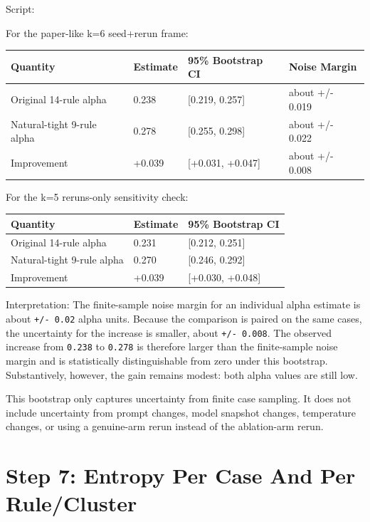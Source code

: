 \documentclass[11pt]{article}
\begin{document}
Script:

\href{../scripts/bootstrap_alpha_uncertainty.py}{}

For the paper-like k=6 seed+rerun frame:

\begin{longtable}{L{0.34\textwidth} R{0.12\textwidth} R{0.20\textwidth} R{0.18\textwidth}}
\toprule
Quantity & Estimate & 95\% Bootstrap CI & Noise Margin \\
\midrule
\endhead
Original 14-rule alpha & 0.238 & [0.219, 0.257] & about +/- 0.019 \\
Natural-tight 9-rule alpha & 0.278 & [0.255, 0.298] & about +/- 0.022 \\
Improvement & +0.039 & [+0.031, +0.047] & about +/- 0.008 \\
\bottomrule
\end{longtable}

For the k=5 reruns-only sensitivity check:

\begin{longtable}{L{0.40\textwidth} R{0.15\textwidth} R{0.25\textwidth}}
\toprule
Quantity & Estimate & 95\% Bootstrap CI \\
\midrule
\endhead
Original 14-rule alpha & 0.231 & [0.212, 0.251] \\
Natural-tight 9-rule alpha & 0.270 & [0.246, 0.292] \\
Improvement & +0.039 & [+0.030, +0.048] \\
\bottomrule
\end{longtable}

Interpretation: The finite-sample noise margin for an individual alpha estimate is about \texttt{+/- 0.02} alpha units. Because the comparison is paired on the same cases, the uncertainty for the increase is smaller, about \texttt{+/- 0.008}. The observed increase from \texttt{0.238} to \texttt{0.278} is therefore larger than the finite-sample noise margin and is statistically distinguishable from zero under this bootstrap. Substantively, however, the gain remains modest: both alpha values are still low.

This bootstrap only captures uncertainty from finite case sampling. It does not include uncertainty from prompt changes, model snapshot changes, temperature changes, or using a genuine-arm rerun instead of the ablation-arm rerun.

\section*{Step 7: Entropy Per Case And Per Rule/Cluster}
\end{document}
